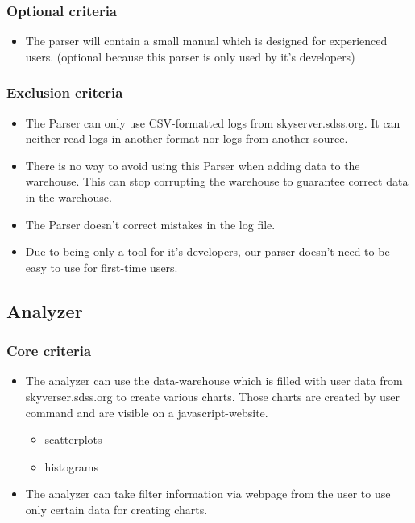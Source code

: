 \subsubsection{Optional criteria}
\begin{itemize}
\item The parser will contain a small manual which is designed for experienced users. 
(optional because this parser is only used by it's developers)
\end{itemize}

\subsubsection{Exclusion criteria}
\begin{itemize}
\item The Parser can only use CSV-formatted logs from skyserver.sdss.org. 
It can neither read logs in another format nor logs
from another source.
\item There is no way to avoid using this Parser when adding data to the warehouse. 
This can stop corrupting the warehouse to guarantee correct data in the warehouse.
\item The Parser doesn't correct mistakes in the log file.
\item Due to being only a tool for it's developers, our parser doesn't need to be easy to use for first-time users.
\end{itemize}



\subsection{Analyzer}

\subsubsection{Core criteria}
\begin{itemize}
\item The analyzer can use the data-warehouse which is filled with user data  
from skyverser.sdss.org to create various charts. 
Those charts are created by user command and are visible on a javascript-website.
\begin{itemize}
\item scatterplots
\item histograms
\end{itemize}
\item The analyzer can take filter information via webpage from the user to use only certain data for creating charts.
\end{itemize}

